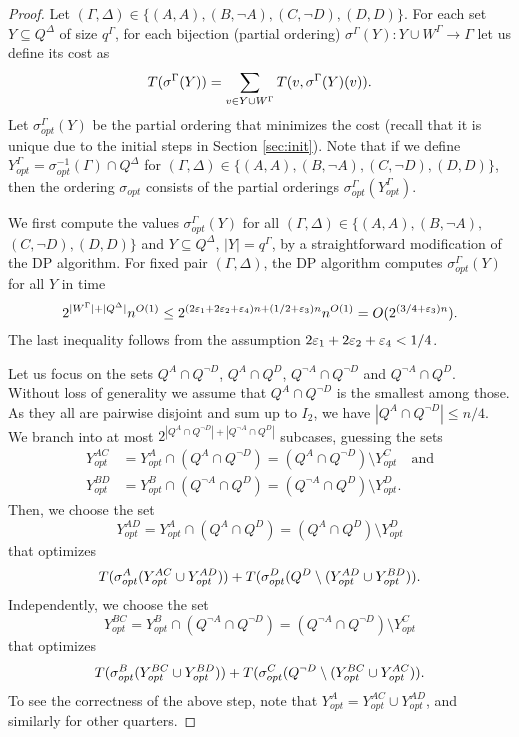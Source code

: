 \documentclass{article}
\theoremstyle{definition}
\begin{document}
\begin{proof}
Let $(\Gamma,\Delta) \in \{(A,A), (B,\neg A), (C,\neg D), (D,D)\}$.
For each set $Y \subseteq Q^\Delta$ of size $q^\Gamma$, for each bijection (partial ordering) $\sigma^{\Gamma}(Y):Y \cup W^\Gamma \to \Gamma$ let us define its cost as
$$T(\sigma^{\Gamma}(Y)) = \sum_{v \in Y \cup W^\Gamma} T(v,\sigma^{\Gamma}(Y)(v)).$$
Let $\sigma_{opt}^{\Gamma}(Y)$ be the partial ordering that minimizes the cost (recall that it is unique due to the initial steps in Section \ref{sec:init}).
Note that if we define $Y_{opt}^\Gamma = \sigma_{opt}^{-1}(\Gamma) \cap Q^\Delta$ for $(\Gamma,\Delta) \in \{(A,A), (B,\neg A), (C,\neg D), (D,D)\}$, then
the ordering $\sigma_{opt}$ consists of the partial orderings $\sigma_{opt}^{\Gamma}(Y_{opt}^\Gamma)$.

We first compute the values $\sigma_{opt}^{\Gamma}(Y)$ for all $(\Gamma,\Delta) \in \{(A,A),(B,\neg A),$  $(C,\neg D),(D,D)\}$ and $Y \subseteq Q^\Delta$, $|Y| = q^\Gamma$, by a straightforward
modification of the DP algorithm. For fixed pair $(\Gamma,\Delta)$, the DP algorithm computes $\sigma_{opt}^{\Gamma}(Y)$ for all $Y$ in time
$$2^{|W^\Gamma|+|Q^\Delta|} n^{O(1)} \leq  2^{(2\varepsilon_1+2\varepsilon_2+\varepsilon_4)n + (1/2+\varepsilon_3)n} n^{O(1)} = O(2^{(3/4+\varepsilon_3)n}).$$
The last inequality follows from the assumption $2\varepsilon_1+2\varepsilon_2+\varepsilon_4 < 1/4$.

Let us focus on the sets $Q^A \cap Q^{\neg D}$, $Q^A \cap Q^D$, $Q^{\neg A} \cap Q^{\neg D}$ and $Q^{\neg A} \cap Q^D$. Without loss of generality we assume that
$Q^A \cap Q^{\neg D}$ is the smallest among those. As they all are pairwise disjoint and sum up to $I_2$, we have $|Q^A \cap Q^{\neg D}| \leq n/4$.
We branch into at most $2^{|Q^A \cap Q^{\neg D}|+|Q^{\neg A} \cap Q^D|}$ subcases, guessing the sets
\begin{align*}
Y_{opt}^{AC} &= Y_{opt}^A \cap (Q^A \cap Q^{\neg D}) = (Q^A \cap Q^{\neg D}) \setminus Y_{opt}^C\quad\textrm{and}\\
Y_{opt}^{BD} &= Y_{opt}^B \cap (Q^{\neg A} \cap Q^D) = (Q^{\neg A} \cap Q^D) \setminus Y_{opt}^D.
\end{align*}
Then, we choose the set
$$Y_{opt}^{AD} = Y_{opt}^A \cap (Q^A \cap Q^D) = (Q^A \cap Q^D) \setminus Y_{opt}^D$$
that optimizes
$$T(\sigma_{opt}^{A}(Y_{opt}^{AC} \cup Y_{opt}^{AD}))+T(\sigma_{opt}^{D}(Q^D \setminus (Y_{opt}^{AD} \cup Y_{opt}^{BD})).$$
Independently, we choose the set
$$Y_{opt}^{BC} = Y_{opt}^B \cap (Q^{\neg A} \cap Q^{\neg D}) = (Q^{\neg A} \cap Q^{\neg D}) \setminus Y_{opt}^C$$
that optimizes
$$T(\sigma_{opt}^{B}(Y_{opt}^{BC} \cup Y_{opt}^{BD}))+T(\sigma_{opt}^{C}(Q^{\neg D} \setminus (Y_{opt}^{BC} \cup Y_{opt}^{AC})).$$
To see the correctness of the above step, note that $Y_{opt}^A = Y_{opt}^{AC} \cup Y_{opt}^{AD}$, and similarly for other quarters.


\end{proof}
\end{document}
